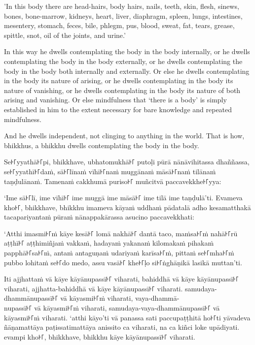 'In this body there are head-hairs, body hairs, nails, teeth, skin, flesh,
sinews, bones, bone-marrow, kidneys, heart, liver, diaphragm, spleen, lungs,
intestines, mesentery, stomach, feces, bile, phlegm, pus, blood, sweat, fat,
tears, grease, spittle, snot, oil of the joints, and urine.'

In this way he dwells contemplating the body in the body internally, or he
dwells contemplating the body in the body externally, or he dwells contemplating
the body in the body both internally and externally. Or else he dwells
contemplating in the body its nature of arising, or he dwells contemplating in
the body its nature of vanishing, or he dwells contemplating in the body its
nature of both arising and vanishing. Or else mindfulness that ‘there is a body’
is simply established in him to the extent necessary for bare knowledge and
repeated mindfulness.

And he dwells independent, not clinging to anything in the world. That is how,
bhikkhus, a bhikkhu dwells contemplating the body in the body.


\paliPage

Se꜔꜒yyathā꜔꜒pi, bhikkhave, ubhatomukhā꜔꜒ putoḷi pūrā nānāvihitassa dhaññassa,
se꜔꜒yyathī꜔꜒daṁ, sā꜔꜒līnaṁ vīhī꜔꜒naṁ muggānaṁ māsā꜔꜒naṁ tilānaṁ taṇḍulānaṁ. Tamenaṁ
cakkhumā puriso꜔꜒ muñcitvā paccavekkhe꜔꜒yya:

‘Ime sā꜔꜒lī, ime vīhī꜔꜒ ime muggā ime māsā꜔꜒ ime tilā ime taṇḍulā’ti. Evameva kho꜔꜒,
bhikkhave, bhikkhu imameva kāyaṁ uddhaṁ pādatalā adho kesamatthakā
tacapariyantaṁ pūraṁ nānappakārassa asucino paccavekkhati:

‘Atthi imasmi꜔꜒ṁ kāye kesā꜔꜒ lomā nakhā꜔꜒ dantā taco, maṁsa꜔꜒ṁ nahā꜔꜒rū aṭṭhī꜔꜒ aṭṭhimiñjaṁ
vakkaṁ, hadayaṁ yakanaṁ kilomakaṁ pihakaṁ papphā꜔꜒sa꜔꜒ṁ, antaṁ antaguṇaṁ udariyaṁ
karīsa꜔꜒ṁ, pittaṁ se꜔꜒mha꜔꜒ṁ pubbo lohitaṁ se꜔꜒do medo, assu vasā꜔꜒ khe꜔꜒ḷo si꜔꜒ṅghāṇikā
lasikā muttan’ti.

Iti ajjhattaṁ vā kāye kāyānupassī꜔꜒ viharati, bahiddhā vā kāye kāyānupassī꜔꜒
viharati, ajjhatta-bahiddhā vā kāye kāyānupassī꜔꜒ viharati. samudaya-dhammānupassī꜔꜒
vā kāyasmi꜔꜒ṁ viharati, vaya-dhammā-\\
nupassī꜔꜒ vā kāyasmi꜔꜒ṁ viharati, samudaya-vaya-dhammānupassī꜔꜒ vā kāyasmi꜔꜒ṁ viharati.
‘atthi kāyo’ti vā panassa sati paccupaṭṭhitā ho꜔꜒ti yāvadeva ñāṇamattāya
paṭissatimattāya anissito ca viharati, na ca kiñci loke upādiyati. evampi kho꜔꜒,
bhikkhave, bhikkhu kāye kāyānupassī꜔꜒ viharati.

